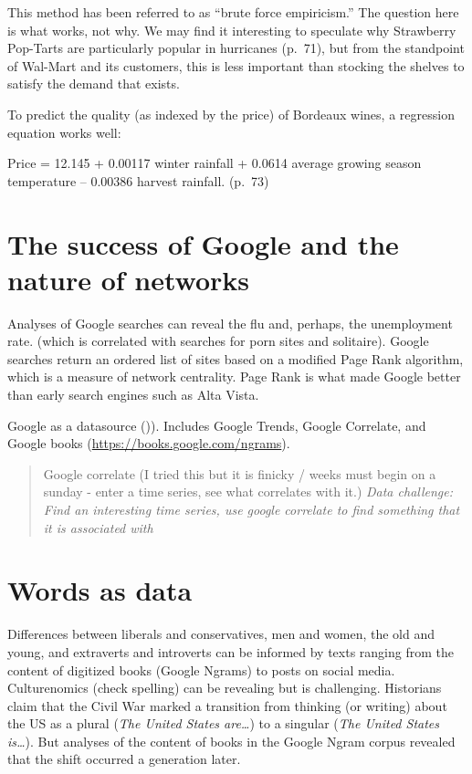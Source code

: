 \documentclass[]{book}
\theoremstyle{definition}
\theoremstyle{definition}
\theoremstyle{definition}
\theoremstyle{remark}
\begin{document}
This method has been referred to as ``brute force empiricism.'' The
question here is what works, not why. We may find it interesting to
speculate why Strawberry Pop-Tarts are particularly popular in
hurricanes (p.~71), but from the standpoint of Wal-Mart and its
customers, this is less important than stocking the shelves to satisfy
the demand that exists.

To predict the quality (as indexed by the price) of Bordeaux wines, a
regression equation works well:

Price = 12.145 + 0.00117 winter rainfall + 0.0614 average growing season
temperature -- 0.00386 harvest rainfall. (p.~73)

\section{The success of Google and the nature of
networks}\label{the-success-of-google-and-the-nature-of-networks}

Analyses of Google searches can reveal the flu and, perhaps, the
unemployment rate. (which is correlated with searches for porn sites and
solitaire). Google searches return an ordered list of sites based on a
modified Page Rank algorithm, which is a measure of network centrality.
Page Rank is what made Google better than early search engines such as
Alta Vista.

Google as a datasource
\citep[(\url{https://medium.com/}][]{pewresearch/using-google-trends-data-for-research-here-are-6-questions-to-ask-a7097f5fb526}()).
Includes Google Trends, Google Correlate, and Google books
(\url{https://books.google.com/ngrams}).

\begin{quote}
Google correlate (I tried this but it is finicky / weeks must begin on a
sunday - enter a time series, see what correlates with it.) \emph{Data
challenge: Find an interesting time series, use google correlate to find
something that it is associated with}
\end{quote}

\section{Words as data}\label{words-as-data}

Differences between liberals and conservatives, men and women, the old
and young, and extraverts and introverts can be informed by texts
ranging from the content of digitized books (Google Ngrams) to posts on
social media. Culturenomics (check spelling) can be revealing but is
challenging. Historians claim that the Civil War marked a transition
from thinking (or writing) about the US as a plural (\emph{The United
States are\ldots{}}) to a singular (\emph{The United States
is\ldots{}}). But analyses of the content of books in the Google Ngram
corpus revealed that the shift occurred a generation later.
\end{document}
